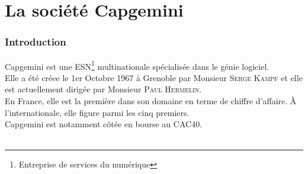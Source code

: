 \chapter{La société Capgemini}
\subsection*{Introduction}
Capgemini est une ESN\footnote{Entreprise de services du numérique} multinationale spécialisée dans le génie logiciel.
\\Elle a été créee le 1er Octobre 1967 à Grenoble par Monsieur \textsc{Serge Kampf} et elle est actuellement dirigée par  Monsieur \textsc{Paul Hermelin}.\\
En France, elle est la première dans son domaine en terme de chiffre d'affaire. \`A l'internationale, elle figure parmi les cinq premiers.
\\Capgemini est notamment côtée en bourse au CAC40.
\\\\
\begin{figure}[h]
\end{figure}

\newpage
